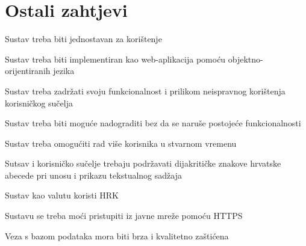 				
				\eject
	
		\section{Ostali zahtjevi}
		
		\begin{packed_item}
			
			\item  Sustav treba biti jednostavan za korištenje
			\item  Sustav treba biti implementiran kao web-aplikacija pomoću objektno-orijentiranih jezika
			\item  Sustav treba zadržati svoju funkcionalnost i prilikom neispravnog korištenja korisničkog sučelja
			\item  Sustav treba biti moguće nadograditi bez da se naruše postojeće funkcionalnosti
			\item  Sustav treba omogućiti rad više korisnika u stvarnom vremenu
			\item  Sutsav i korisničko sučelje trebaju podržavati dijakritičke znakove hrvatske abecede pri unosu i prikazu tekstualnog sadžaja
			\item  Sustav kao valutu koristi HRK
			\item  Sustavu se treba moći pristupiti iz javne mreže pomoću HTTPS
			\item  Veza s bazom podataka mora biti brza i kvalitetno zaštićena
			
		\end{packed_item}
			
			 
			 
			 
	
